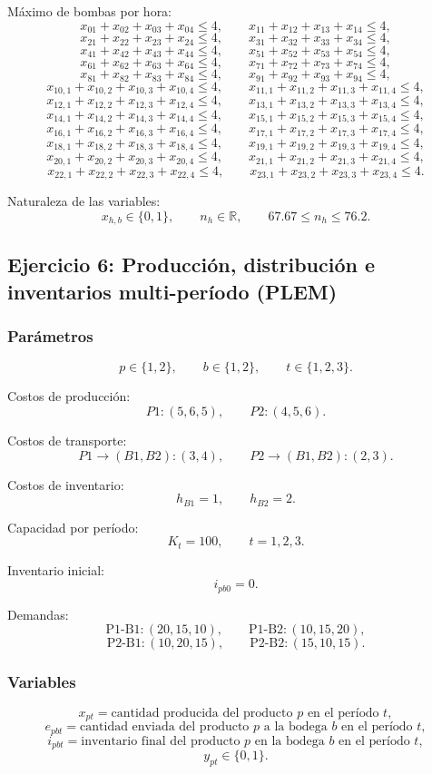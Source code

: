\documentclass[12pt,a4paper]{article}
\begin{document}
Máximo de bombas por hora:
\[
x_{01}+x_{02}+x_{03}+x_{04}\le 4,\qquad x_{11}+x_{12}+x_{13}+x_{14}\le 4,
\]
\[
x_{21}+x_{22}+x_{23}+x_{24}\le 4,\qquad x_{31}+x_{32}+x_{33}+x_{34}\le 4,
\]
\[
x_{41}+x_{42}+x_{43}+x_{44}\le 4,\qquad x_{51}+x_{52}+x_{53}+x_{54}\le 4,
\]
\[
x_{61}+x_{62}+x_{63}+x_{64}\le 4,\qquad x_{71}+x_{72}+x_{73}+x_{74}\le 4,
\]
\[
x_{81}+x_{82}+x_{83}+x_{84}\le 4,\qquad x_{91}+x_{92}+x_{93}+x_{94}\le 4,
\]
\[
x_{10,1}+x_{10,2}+x_{10,3}+x_{10,4}\le 4,\qquad x_{11,1}+x_{11,2}+x_{11,3}+x_{11,4}\le 4,
\]
\[
x_{12,1}+x_{12,2}+x_{12,3}+x_{12,4}\le 4,\qquad x_{13,1}+x_{13,2}+x_{13,3}+x_{13,4}\le 4,
\]
\[
x_{14,1}+x_{14,2}+x_{14,3}+x_{14,4}\le 4,\qquad x_{15,1}+x_{15,2}+x_{15,3}+x_{15,4}\le 4,
\]
\[
x_{16,1}+x_{16,2}+x_{16,3}+x_{16,4}\le 4,\qquad x_{17,1}+x_{17,2}+x_{17,3}+x_{17,4}\le 4,
\]
\[
x_{18,1}+x_{18,2}+x_{18,3}+x_{18,4}\le 4,\qquad x_{19,1}+x_{19,2}+x_{19,3}+x_{19,4}\le 4,
\]
\[
x_{20,1}+x_{20,2}+x_{20,3}+x_{20,4}\le 4,\qquad x_{21,1}+x_{21,2}+x_{21,3}+x_{21,4}\le 4,
\]
\[
x_{22,1}+x_{22,2}+x_{22,3}+x_{22,4}\le 4,\qquad x_{23,1}+x_{23,2}+x_{23,3}+x_{23,4}\le 4.
\]

Naturaleza de las variables:
\[
x_{h,b}\in\{0,1\},\qquad n_h\in\mathbb{R},\qquad 67.67\le n_h\le 76.2.
\]

\subsection{Ejercicio 6: Producción, distribución e inventarios multi-período (PLEM)}

\subsubsection*{Parámetros}
\[
p\in\{1,2\},\qquad b\in\{1,2\},\qquad t\in\{1,2,3\}.
\]

Costos de producción:
\[
P1:(5,6,5),\qquad P2:(4,5,6).
\]

Costos de transporte:
\[
P1\to(B1,B2):(3,4),\qquad P2\to(B1,B2):(2,3).
\]

Costos de inventario:
\[
h_{B1}=1,\qquad h_{B2}=2.
\]

Capacidad por período:
\[
K_t=100,\qquad t=1,2,3.
\]

Inventario inicial:
\[
i_{pb0}=0.
\]

Demandas:
\[
\text{P1-B1}:(20,15,10),\qquad \text{P1-B2}:(10,15,20),
\]
\[
\text{P2-B1}:(10,20,15),\qquad \text{P2-B2}:(15,10,15).
\]

\subsubsection*{Variables}
\[
x_{pt}=\text{cantidad producida del producto } p \text{ en el período } t,
\]
\[
e_{pbt}=\text{cantidad enviada del producto } p \text{ a la bodega } b \text{ en el período } t,
\]
\[
i_{pbt}=\text{inventario final del producto } p \text{ en la bodega } b \text{ en el período } t,
\]
\[
y_{pt}\in\{0,1\}.
\]
\end{document}
